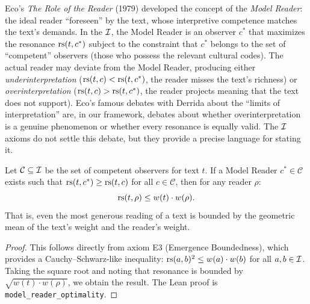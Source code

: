 \begin{remark}
Eco's \textit{The Role of the Reader} (1979) developed the concept of the \emph{Model Reader}: the ideal reader ``foreseen'' by the text, whose interpretive competence matches the text's demands. In the $\mathcal{I}$, the Model Reader is an observer $c^*$ that maximizes the resonance $\mathrm{rs}(t, c^*)$ subject to the constraint that $c^*$ belongs to the set of ``competent'' observers (those who possess the relevant cultural codes). The actual reader may deviate from the Model Reader, producing either \emph{underinterpretation} ($\mathrm{rs}(t, c) < \mathrm{rs}(t, c^*)$, the reader misses the text's richness) or \emph{overinterpretation} ($\mathrm{rs}(t, c) > \mathrm{rs}(t, c^*)$, the reader projects meaning that the text does not support). Eco's famous debates with Derrida about the ``limits of interpretation'' are, in our framework, debates about whether overinterpretation is a genuine phenomenon or whether every resonance is equally valid. The $\mathcal{I}$ axioms do not settle this debate, but they provide a precise language for stating it.
\end{remark}

\begin{theorem}
\label{thm:model-reader}
Let $\mathcal{C} \subseteq \mathcal{I}$ be the set of competent observers for text $t$. If a Model Reader $c^* \in \mathcal{C}$ exists such that $\mathrm{rs}(t, c^*) \geq \mathrm{rs}(t, c)$ for all $c \in \mathcal{C}$, then for any reader $\rho$:
\[
  \mathrm{rs}(t, \rho) \leq w(t) \cdot w(\rho).
\]
That is, even the most generous reading of a text is bounded by the geometric mean of the text's weight and the reader's weight.
\end{theorem}

\begin{proof}
This follows directly from axiom E3 (Emergence Boundedness), which provides a Cauchy--Schwarz-like inequality: $\mathrm{rs}(a, b)^2 \leq w(a) \cdot w(b)$ for all $a, b \in \mathcal{I}$. Taking the square root and noting that resonance is bounded by $\sqrt{w(t) \cdot w(\rho)}$, we obtain the result. The Lean proof is \texttt{model\_reader\_optimality}.
\end{proof}

